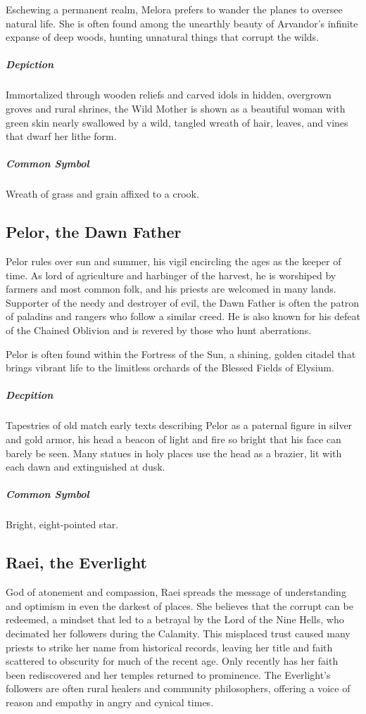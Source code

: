 \documentclass[letterpaper,twocolumn,openany,nodeprecatedcode]{dndbook}
\begin{document}
Eschewing a permanent realm, Melora prefers to wander the planes to oversee natural life.
She is often found among the unearthly beauty of Arvandor’s infinite expanse of deep woods,
hunting unnatural things that corrupt the wilds.

\subparagraph{Depiction}
Immortalized through wooden reliefs and carved idols in hidden, overgrown groves and rural
shrines, the Wild Mother is shown as a beautiful woman with green skin nearly swallowed by
a wild, tangled wreath of hair, leaves, and vines that dwarf her lithe form.

\subparagraph{Common Symbol}
Wreath of grass and grain affixed to a crook.

\subsection{Pelor, the Dawn Father}

Pelor rules over sun and summer, his vigil encircling the ages as the keeper of time. As
lord of agriculture and harbinger of the harvest, he is worshiped by farmers and most common
folk, and his priests are welcomed in many lands. Supporter of the needy and destroyer of
evil, the Dawn Father is often the patron of paladins and rangers who follow a similar creed.
He is also known for his defeat of the Chained Oblivion and is revered by those who
hunt aberrations.

Pelor is often found within the Fortress of the Sun, a shining, golden citadel that brings
vibrant life to the limitless orchards of the Blessed Fields of Elysium.

\subparagraph{Decpition}
Tapestries of old match early texts describing Pelor as a paternal figure in silver and
gold armor, his head a beacon of light and fire so bright that his face can barely be seen.
Many statues in holy places use the head as a brazier, lit with each dawn and extinguished
at dusk.

\subparagraph{Common Symbol}
Bright, eight-pointed star.

\subsection{Raei, the Everlight}

God of atonement and compassion, Raei spreads the message of understanding and optimism in
even the darkest of places. She believes that the corrupt can be redeemed, a mindset that led
to a betrayal by the Lord of the Nine Hells, who decimated her followers during the Calamity.
This misplaced trust caused many priests to strike her name from historical records, leaving
her title and faith scattered to obscurity for much of the recent age. Only recently has her
faith been rediscovered and her temples returned to prominence. The Everlight’s followers are
often rural healers and community philosophers, offering a voice of reason and empathy in
angry and cynical times.
\end{document}
